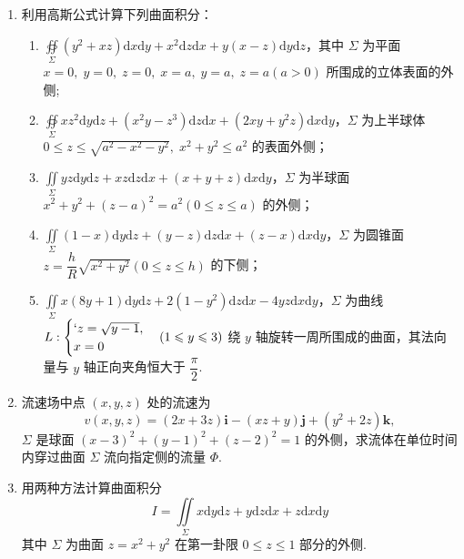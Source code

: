 \begin{enumerate}\setlength{\itemsep}{7pt}
    \item 利用高斯公式计算下列曲面积分：
    \begin{enumerate}[(1)]\setlength{\itemsep}{5pt}\setlength{\topsep}{15pt}
        \item $\displaystyle\oiint\limits_{\Sigma}(y^2+xz)\text{d}x\text{d}y+x^2\text{d}z\text{d}x+y(x-z)\text{d}y\text{d}z$，其中 $\Sigma$ 为平面 $x=0,\;y=0,\;z=0,\;x=a,\;y=a,\;z=a(a>0)$ 所围成的立体表面的外侧;
        \item $\displaystyle\oiint\limits_{\Sigma}xz^2\text{d}y\text{d}z+(x^2y-z^3)\text{d}z\text{d}x+(2xy+y^2z)\text{d}x\text{d}y$，$\Sigma$ 为上半球体 $0\leqslant z\leqslant \sqrt{a^2-x^2-y^2},\;x^2+y^2\leqslant a^2$ 的表面外侧；
        \item $\displaystyle\iint\limits_{\Sigma}yz\text{d}y\text{d}z+xz\text{d}z\text{d}x+(x+y+z)\text{d}x\text{d}y$，$\Sigma$ 为半球面 $x^2+y^2+(z-a)^2=a^2(0\leqslant z\leqslant a)$ 的外侧；
        \item $\displaystyle\iint\limits_{\Sigma}(1-x)\text{d}y\text{d}z+(y-z)\text{d}z\text{d}x+(z-x)\text{d}x\text{d}y$，$\Sigma$ 为圆锥面 $z=\dfrac{h}{R}\sqrt{x^2+y^2}(0\leqslant z\leqslant h)$ 的下侧；
        \item $\displaystyle\iint\limits_{\Sigma}x(8y+1)\text{d}y\text{d}z+2(1-y^2)\text{d}z\text{d}x-4yz\text{d}x\text{d}y$，$\Sigma$ 为曲线 $L:\begin{cases}
            `z=\sqrt{y-1},\\
            x=0
        \end{cases}(1\leqslant y\leqslant 3)$ 绕 $y$ 轴旋转一周所围成的曲面，其法向量与 $y$ 轴正向夹角恒大于 $\dfrac{\pi}{2}$.
    \end{enumerate}

    \item 流速场中点 $(x, y, z)$ 处的流速为
    \[
        v(x, y, z)=(2x+3z)\boldsymbol{i}-(xz+y)\boldsymbol{j}+(y^2+2z)\boldsymbol{k},
    \]
    $\Sigma$ 是球面 $(x-3)^2+(y-1)^2+(z-2)^2=1$ 的外侧，求流体在单位时间内穿过曲面 $\Sigma$ 流向指定侧的流量 $\Phi$.

    \item 用两种方法计算曲面积分
    \[
        I=\iint\limits_{\Sigma}x\text{d}y\text{d}z+y\text{d}z\text{d}x+z\text{d}x\text{d}y
    \]
    其中 $\Sigma$ 为曲面 $z=x^2+y^2$ 在第一卦限 $0\leqslant z\leqslant 1$ 部分的外侧.


\end{enumerate}
